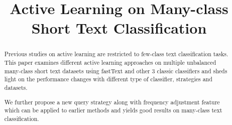 \documentclass{article}
\title{Active Learning on Many-class Short Text Classification}
\newcommand{\KZ}[1]{\textcolor{blue}{Kenny: #1}}
\begin{document}
\maketitle

\begin{abstract}

Previous studies on active learning are restricted to few-class text classification tasks. 
This paper examines different active learning approaches on multiple unbalanced 
many-class short text datasets using fastText and other 3 classic classifiers and sheds light 
on the performance changes with 
different type of classifier, strategies and datasets.

We further propose a new query strategy along with frequency adjustment feature 
which can be applied to earlier methods and yields good results on many-class text classification.
\end{abstract}









% 


% 


\end{document}
